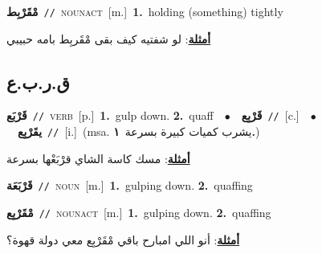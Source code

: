\documentclass[10pt,a4paper,twoside]{article} %
\begin{document}
\begin{multicols}{2}
{\setlength\topsep{0pt}\textbf{\foreignlanguage{arabic}{مْقَرْبِط}}\ {\color{gray}\texttt{//}\color{black}}\ \textsc{noun\textunderscore act}\ [m.]\ \textbf{1.}~holding (something) tightly\  \begin{flushright}\color{gray}\foreignlanguage{arabic}{\textbf{\underline{\foreignlanguage{arabic}{أمثلة}}}: لو شفتيه كيف بقى مْقَربِط بامه حبيبي}\end{flushright}\color{black}} \vspace{2mm}

\vspace{-3mm}
\subsection*{\color{blue}\foreignlanguage{arabic}{ق.ر.ب.ع}\color{blue}{}} 

{\setlength\topsep{0pt}\textbf{\foreignlanguage{arabic}{قَرْبَع}}\ {\color{gray}\texttt{//}\color{black}}\ \textsc{verb}\ [p.]\ \textbf{1.}~gulp down.  \textbf{2.}~quaff\ \ $\bullet$\ \ \setlength\topsep{0pt}\textbf{\foreignlanguage{arabic}{قَرْبِع}}\ {\color{gray}\texttt{//}\color{black}}\ [c.]\ \ $\bullet$\ \ \setlength\topsep{0pt}\textbf{\foreignlanguage{arabic}{يقَرْبِع}}\ {\color{gray}\texttt{//}\color{black}}\ [i.]\ \color{gray}(msa. \foreignlanguage{arabic}{يشرب كميات كبيرة بسرعة}~\foreignlanguage{arabic}{\textbf{١.}})\color{black}\  \begin{flushright}\color{gray}\foreignlanguage{arabic}{\textbf{\underline{\foreignlanguage{arabic}{أمثلة}}}: مسك كاسة الشاي قرْبَعْها بسرعة}\end{flushright}\color{black}} \vspace{2mm}

{\setlength\topsep{0pt}\textbf{\foreignlanguage{arabic}{قَرْبَعَة}}\ {\color{gray}\texttt{//}\color{black}}\ \textsc{noun}\ [m.]\ \textbf{1.}~gulping down.  \textbf{2.}~quaffing\ } \vspace{2mm}

{\setlength\topsep{0pt}\textbf{\foreignlanguage{arabic}{مْقَرْبِع}}\ {\color{gray}\texttt{//}\color{black}}\ \textsc{noun\textunderscore act}\ [m.]\ \textbf{1.}~gulping down.  \textbf{2.}~quaffing\  \begin{flushright}\color{gray}\foreignlanguage{arabic}{\textbf{\underline{\foreignlanguage{arabic}{أمثلة}}}: أنو اللي امبارح باقي مْقَرْبِع معي دولة قهوة؟}\end{flushright}\color{black}} \vspace{2mm}


\end{multicols}
\end{document}
